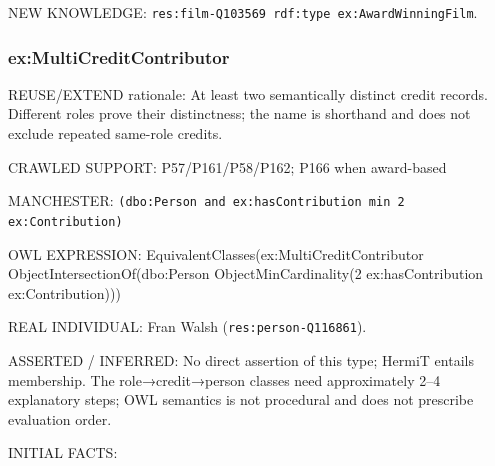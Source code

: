 \documentclass[
  11pt,
]{article}
\begin{document}
NEW KNOWLEDGE:
\texttt{res:\allowbreak{}film\allowbreak{}-\allowbreak{}\allowbreak{}Q103569\allowbreak{} rdf:\allowbreak{}typ\allowbreak{}e ex:\allowbreak{}\allowbreak{}Awa\allowbreak{}rd\allowbreak{}Winnin\allowbreak{}g\allowbreak{}Film}.

\subsubsection{\texorpdfstring{ex:\allowbreak{}\allowbreak{}Multi\allowbreak{}\allowbreak{}Credit\allowbreak{}Co\allowbreak{}ntributo\allowbreak{}r}{}}\label{exmulticreditcontributor}

REUSE/EXTEND rationale: At least two semantically distinct credit
records. Different roles prove their distinct\allowbreak{}ness; the name
is shorthand and does not exclude repeated same-role credits.

CRAWLED SUPPORT:
P57/\allowbreak{}\allowbreak{}P161\allowbreak{}/\allowbreak{}\allowbreak{}P58/\allowbreak{}\allowbreak{}P16\allowbreak{}2;
P166 when award-based

MANCHESTER:
\texttt{(dbo:\allowbreak{}\allowbreak{}Per\allowbreak{}son and \allowbreak{}ex:\allowbreak{}has\allowbreak{}Co\allowbreak{}ntributi\allowbreak{}on min 2\allowbreak{} ex:\allowbreak{}\allowbreak{}Cont\allowbreak{}ribution\allowbreak{})}

OWL EXPRESSION:
Equivale\allowbreak{}nt\allowbreak{}Classe\allowbreak{}s(ex:\allowbreak{}\allowbreak{}Mul\allowbreak{}ti\allowbreak{}Credit\allowbreak{}\allowbreak{}Contribu\allowbreak{}tor
Object\allowbreak{}In\allowbreak{}tersecti\allowbreak{}on\allowbreak{}Of(dbo\allowbreak{}:\allowbreak{}\allowbreak{}Person
Object\allowbreak{}Mi\allowbreak{}n\allowbreak{}Cardina\allowbreak{}lity(2
ex:\allowbreak{}has\allowbreak{}Co\allowbreak{}ntributi\allowbreak{}on
ex:\allowbreak{}\allowbreak{}Contr\allowbreak{}ibution)\allowbreak{}))

REAL INDIVIDUAL: Fran Walsh
(\texttt{res:\allowbreak{}pers\allowbreak{}on-\allowbreak{}\allowbreak{}Q1168\allowbreak{}61}).

ASSERTED / INFERRED: No direct assertion of this type; HermiT entails
membership. The role→credit→person classes need
approxim\allowbreak{}ately 2--4 explanatory steps; OWL semantics is not
procedural and does not prescribe evaluation order.

INITIAL FACTS:
\end{document}
